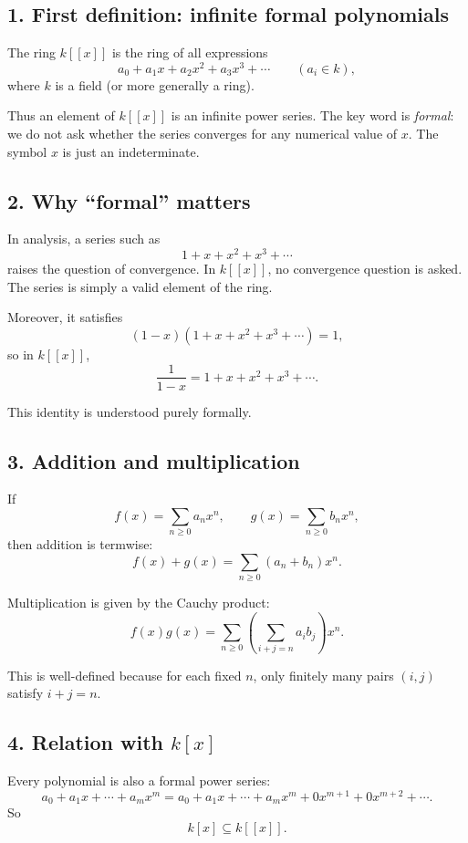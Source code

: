 \documentclass[12pt,a4paper]{article}
\theoremstyle{plain}
\theoremstyle{definition}      %
\begin{document}
	\subsection*{1. First definition: infinite formal polynomials}
	
	The ring \(k[[x]]\) is the ring of all expressions
	\[
	a_0+a_1x+a_2x^2+a_3x^3+\cdots
	\qquad (a_i\in k),
	\]
	where \(k\) is a field (or more generally a ring).
	
	Thus an element of \(k[[x]]\) is an infinite power series. The key word is \emph{formal}: we do not ask whether the series converges for any numerical value of \(x\). The symbol \(x\) is just an indeterminate.
	
	\subsection*{2. Why ``formal'' matters}
	
	In analysis, a series such as
	\[
	1+x+x^2+x^3+\cdots
	\]
	raises the question of convergence. In \(k[[x]]\), no convergence question is asked. The series is simply a valid element of the ring.
	
	Moreover, it satisfies
	\[
	(1-x)(1+x+x^2+x^3+\cdots)=1,
	\]
	so in \(k[[x]]\),
	\[
	\frac{1}{1-x}=1+x+x^2+x^3+\cdots.
	\]
	
	This identity is understood purely formally.
	
	\subsection*{3. Addition and multiplication}
	
	If
	\[
	f(x)=\sum_{n\ge 0} a_nx^n,
	\qquad
	g(x)=\sum_{n\ge 0} b_nx^n,
	\]
	then addition is termwise:
	\[
	f(x)+g(x)=\sum_{n\ge 0}(a_n+b_n)x^n.
	\]
	
	Multiplication is given by the Cauchy product:
	\[
	f(x)g(x)=\sum_{n\ge 0}\left(\sum_{i+j=n} a_ib_j\right)x^n.
	\]
	
	This is well-defined because for each fixed \(n\), only finitely many pairs \((i,j)\) satisfy \(i+j=n\).
	
	\subsection*{4. Relation with \(k[x]\)}
	
	Every polynomial is also a formal power series:
	\[
	a_0+a_1x+\cdots+a_mx^m
	=
	a_0+a_1x+\cdots+a_mx^m+0x^{m+1}+0x^{m+2}+\cdots.
	\]
	So
	\[
	k[x]\subseteq k[[x]].
	\]
	
\end{document}
